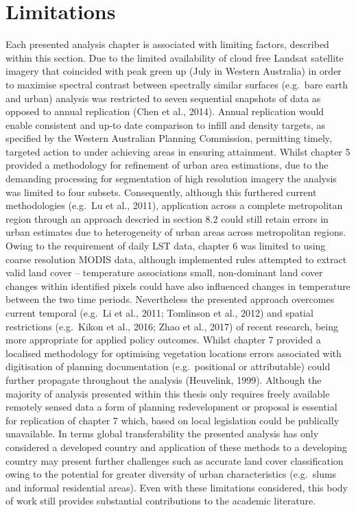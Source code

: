\documentclass[]{book}
\begin{document}
\section{Limitations}\label{limitations}

Each presented analysis chapter is associated with limiting factors,
described within this section. Due to the limited availability of cloud
free Landsat satellite imagery that coincided with peak green up (July
in Western Australia) in order to maximise spectral contrast between
spectrally similar surfaces (e.g.~bare earth and urban) analysis was
restricted to seven sequential snapshots of data as opposed to annual
replication (Chen et al., 2014). Annual replication would enable
consistent and up-to date comparison to infill and density targets, as
specified by the Western Australian Planning Commission, permitting
timely, targeted action to under achieving areas in ensuring attainment.
Whilst chapter 5 provided a methodology for refinement of urban area
estimations, due to the demanding processing for segmentation of high
resolution imagery the analysis was limited to four subsets.
Consequently, although this furthered current methodologies (e.g.~Lu et
al., 2011), application across a complete metropolitan region through an
approach descried in section 8.2 could still retain errors in urban
estimates due to heterogeneity of urban areas across metropolitan
regions. Owing to the requirement of daily LST data, chapter 6 was
limited to using coarse resolution MODIS data, although implemented
rules attempted to extract valid land cover -- temperature associations
small, non-dominant land cover changes within identified pixels could
have also influenced changes in temperature between the two time
periods. Nevertheless the presented approach overcomes current temporal
(e.g.~Li et al., 2011; Tomlinson et al., 2012) and spatial restrictions
(e.g.~Kikon et al., 2016; Zhao et al., 2017) of recent research, being
more appropriate for applied policy outcomes. Whilst chapter 7 provided
a localised methodology for optimising vegetation locations errors
associated with digitisation of planning documentation (e.g.~positional
or attributable) could further propagate throughout the analysis
(Heuvelink, 1999). Although the majority of analysis presented within
this thesis only requires freely available remotely sensed data a form
of planning redevelopment or proposal is essential for replication of
chapter 7 which, based on local legislation could be publically
unavailable. In terms global transferability the presented analysis has
only considered a developed country and application of these methods to
a developing country may present further challenges such as accurate
land cover classification owing to the potential for greater diversity
of urban characteristics (e.g.~slums and informal residential areas).
Even with these limitations considered, this body of work still provides
substantial contributions to the academic literature.
\end{document}
